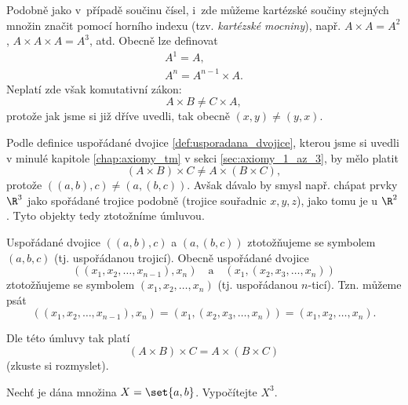 Podobně jako v~případě součinu čísel, i~zde můžeme kartézské součiny stejných množin značit pomocí horního indexu (tzv. \emph{kartézské mocniny}), např. $A\times A=A^2$, $A\times A\times A=A^3$, atd. Obecně lze definovat
\begin{align*}
    A^1=A,\\
    A^n=A^{n-1}\times A.
\end{align*}
Neplatí zde však komutativní zákon:
\begin{equation*}
    A\times B\neq C\times A,
\end{equation*}
protože jak jsme si již dříve uvedli, tak obecně $(x,y)\neq (y,x)$.\par
Podle definice uspořádané dvojice \ref{def:usporadana_dvojice}, kterou jsme si uvedli v minulé kapitole \ref{chap:axiomy_tm} v sekci \ref{sec:axiomy_1_az_3}, by mělo platit
\begin{equation*}
    (A\times B)\times C\neq A\times (B\times C),
\end{equation*}
protože $((a,b),c)\neq(a,(b,c))$. Avšak dávalo by smysl např. chápat prvky $\R^3$ jako spořádané trojice podobně (trojice souřadnic $x,y,z$), jako tomu je u $\R^2$. Tyto objekty tedy ztotožníme úmluvou.
\begin{convention}\label{conv:usporadana_ntice}
    Uspořádané dvojice $((a,b),c)$ a $(a,(b,c))$ ztotožňujeme se symbolem $(a,b,c)$ (tj. uspořádanou trojicí). Obecně uspořádané dvojice
    \begin{equation*}
        ((x_1,x_2,\dots,x_{n-1}),x_n)\quad\text{a}\quad(x_1,(x_2,x_3,\dots,x_n))
    \end{equation*}
    ztotožňujeme se symbolem $(x_1,x_2,\dots,x_n)$ (tj. uspořádanou $n$-ticí). Tzn. můžeme psát
    \begin{equation*}
        ((x_1,x_2,\dots,x_{n-1}),x_n)=(x_1,(x_2,x_3,\dots,x_n))=(x_1,x_2,\dots,x_n).
    \end{equation*}
\end{convention}
Dle této úmluvy tak platí
\begin{equation*}
    (A\times B)\times C=A\times (B\times C)
\end{equation*}
(zkuste si rozmyslet).
\begin{example}
    Nechť je dána množina $X=\set{a,b}$. Vypočítejte $X^3$.
\end{example}

